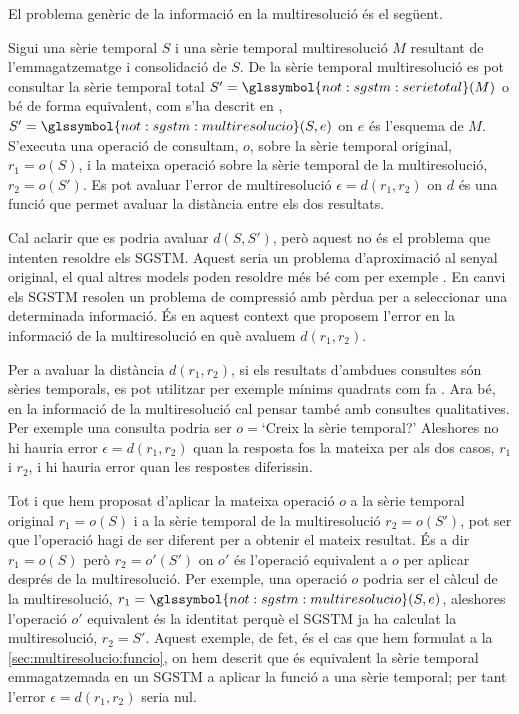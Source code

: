 El problema genèric de la informació en la multiresolució és el següent.
\begin{definition}
  \label{def:informacio:error}
  Sigui una sèrie temporal $S$ i una sèrie temporal multiresolució $M$
  resultant de l'emmagatzematge i consolidació de $S$. De la sèrie
  temporal multiresolució es pot consultar la sèrie temporal total
  $S'=\glssymbol{not:sgstm:serietotal}(M)$ o bé de forma equivalent,
  com s'ha descrit en ,
  $S'=\glssymbol{not:sgstm:multiresolucio}(S,e)$ on $e$ és l'esquema
  de $M$.  S'executa una operació de consultam, $o$, sobre la sèrie
  temporal original, $r_1=o(S)$, i la mateixa operació sobre la sèrie
  temporal de la multiresolució, $r_2=o(S')$. Es pot avaluar l'error
  de multiresolució $\epsilon=d(r_1,r_2)$ on $d$ és una funció que
  permet avaluar la distància entre els dos resultats.
\end{definition}


Cal aclarir que es podria avaluar $d(S,S')$, però aquest no és el
problema que intenten resoldre els \gls{SGSTM}. Aquest seria un
problema d'aproximació al senyal original, el qual altres models poden
resoldre més bé com per exemple \textcite{last01,ogras06}. En canvi
els \gls{SGSTM} resolen un problema de compressió amb pèrdua per a
seleccionar una determinada informació. És en aquest context que
proposem l'error en la informació de la multiresolució en què avaluem
$d(r_1,r_2)$.



Per a avaluar la distància $d(r_1,r_2)$, si els resultats d'ambdues
consultes són sèries temporals, es pot utilitzar per exemple mínims
quadrats com fa \textcite{last01}.  Ara bé, en la informació de la
multiresolució cal pensar també amb consultes qualitatives. Per
exemple una consulta podria ser $o=$`Creix la sèrie temporal?'
Aleshores no hi hauria error $\epsilon=d(r_1,r_2)$ quan la resposta
fos la mateixa per als dos casos, $r_1$ i $r_2$, i hi hauria error
quan les respostes diferissin.


Tot i que hem proposat d'aplicar la mateixa operació $o$ a la sèrie
temporal original $r_1=o(S)$ i a la sèrie temporal de la
multiresolució $r_2=o(S')$, pot ser que l'operació hagi de ser
diferent per a obtenir el mateix resultat. És a dir $r_1=o(S)$ però
$r_2=o'(S')$ on $o'$ és l'operació equivalent a $o$ per aplicar
després de la multiresolució.  Per exemple, una operació $o$ podria
ser el càlcul de la multiresolució,
$r_1=\glssymbol{not:sgstm:multiresolucio}(S,e)$, aleshores l'operació
$o'$ equivalent és la identitat perquè el \gls{SGSTM} ja ha calculat
la multiresolució, $r_2=S'$. Aquest exemple, de fet, és el cas que hem
formulat a la \autoref{sec:multiresolucio:funcio}, on hem descrit que
és equivalent la sèrie temporal emmagatzemada en un \gls{SGSTM} a
aplicar la funció  a una sèrie
temporal; per tant l'error $\epsilon =d(r_1,r_2)$ seria nul.



